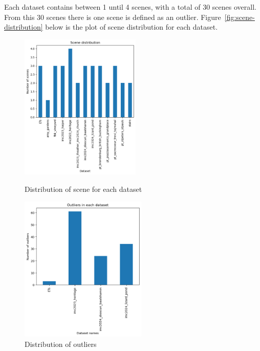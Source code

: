 \documentclass[report.tex]{subfiles}
\begin{document}
    Each dataset contains between 1 until 4 scenes, with a total of 30 scenes overall. From this 30 scenes there is one scene is defined as an outlier. Figure~\ref{fig:scene-distribution} below is the plot of scene distribution for each dataset.

    \begin{figure}[htbp]
        \centering
        \begin{minipage}[t]{0.48\textwidth}
            \centering
            \includegraphics[width=\linewidth, height=7cm]{images/scene_distribution_plog.png}
            \caption{Distribution of scene for each dataset}
            \label{fig:scene-distribution}
        \end{minipage}%
        \hfill
        \begin{minipage}[t]{0.48\textwidth}
            \centering
            \includegraphics[width=\linewidth, height=7cm]{images/outlier_scene_distribution.png}
            \caption{Distribution of outliers}
            \label{fig:outlier-distribution}
        \end{minipage}
    \end{figure}
\end{document}

